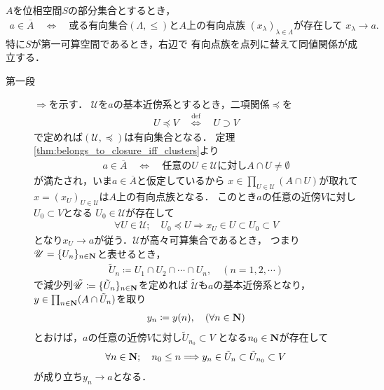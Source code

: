 	\begin{screen}
		\begin{thm}[閉集合は有向点族の極限集合]
		\label{thm:closed_set_is_set_of_limits_of_some_net}
			$A$を位相空間$S$の部分集合とするとき，
			\begin{align}
				a \in \overline{A} \quad \Longleftrightarrow \quad
				\mbox{或る有向集合$(\Lambda,\leq)$と$A$上の有向点族
				$(x_\lambda)_{\lambda \in \Lambda}$が存在して
				$x_\lambda \longrightarrow a$}.
			\end{align}
			特に$S$が第一可算空間であるとき，右辺で
			有向点族を点列に替えて同値関係が成立する．
		\end{thm}
	\end{screen}
	
	\begin{prf}\mbox{}
		\begin{description}
			\item[第一段] $\Longrightarrow$を示す．
				$\mathscr{U}$を$a$の基本近傍系とするとき，二項関係$\preceq$を
				\begin{align}
					U \preceq V \quad \overset{\mathrm{def}}{\Longleftrightarrow} \quad
					U \supset V
				\end{align}
				で定めれば$(\mathscr{U},\preceq)$は有向集合となる．
				定理\ref{thm:belongs_to_closure_iff_clusters}より
				\begin{align}
					a \in \overline{A} \quad \Longleftrightarrow \quad
					\mbox{任意の$U \in \mathscr{U}$に対し$A \cap U \neq \emptyset$}
				\end{align}
				が満たされ，いま$a \in \overline{A}$と仮定しているから
				$x \in \prod_{U \in \mathscr{U}} (A \cap U)$が取れて
				$x = (x_U)_{U \in \mathscr{U}}$は$A$上の有向点族となる．
				このとき$a$の任意の近傍$V$に対し$U_0 \subset V$となる
				$U_0 \in \mathscr{U}$が存在して
				\begin{align}
					\forall U \in \mathscr{U};\quad
					U_0 \preceq U \Longrightarrow x_U \in U \subset U_0 \subset V
				\end{align}
				となり$x_U \longrightarrow a$が従う．$\mathscr{U}$が高々可算集合であるとき，
				つまり$\mathscr{U} = \{U_n\}_{n \in \mathbf{N}}$と表せるとき，
				\begin{align}
					\tilde{U}_n \coloneqq U_1 \cap U_2 \cap \cdots \cap U_n,
					\quad (n=1,2,\cdots) 
				\end{align}
				で減少列$\tilde{\mathscr{U}} \coloneqq \{\tilde{U}_n\}_{n \in \mathbf{N}}$を定めれば
				$\tilde{\mathscr{U}}$も$a$の基本近傍系となり，
				$y \in \prod_{n \in \mathbf{N}}(A \cap \tilde{U}_n)$を取り
				\begin{align}
					y_n \coloneqq y(n),\quad (\forall n \in \mathbf{N})
				\end{align}
				とおけば，$a$の任意の近傍$V$に対し$\tilde{U}_{n_0} \subset V$
				となる$n_0 \in \mathbf{N}$が存在して
				\begin{align}
					\forall n \in \mathbf{N};\quad
					n_0 \leq n \Longrightarrow y_n \in \tilde{U}_n \subset \tilde{U}_{n_0}
					\subset V
				\end{align}
				が成り立ち$y_n \longrightarrow a$となる．
				

\end{description}
\end{prf}
